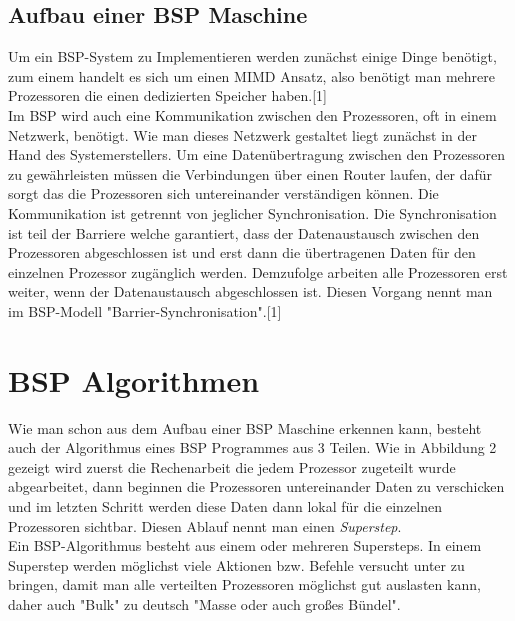 \documentclass[a4paper,10pt]{scrartcl}
\begin{document}
\subsection{Aufbau einer BSP Maschine}
Um ein BSP-System zu Implementieren werden zunächst einige Dinge benötigt, zum einem handelt es sich um einen MIMD Ansatz, also benötigt man mehrere Prozessoren die einen dedizierten Speicher haben.[1]\\
Im BSP wird auch eine Kommunikation zwischen den Prozessoren, oft in einem Netzwerk, benötigt. Wie man dieses Netzwerk gestaltet liegt zunächst in der Hand des Systemerstellers. Um eine Datenübertragung zwischen den Prozessoren zu gewährleisten müssen die Verbindungen über einen Router laufen, der dafür sorgt das die Prozessoren sich untereinander verständigen können. Die Kommunikation ist getrennt von jeglicher Synchronisation. Die Synchronisation ist teil der Barriere welche garantiert, dass der Datenaustausch zwischen den Prozessoren abgeschlossen ist und erst dann die übertragenen Daten für den einzelnen Prozessor zugänglich werden. Demzufolge arbeiten alle Prozessoren erst weiter, wenn der Datenaustausch abgeschlossen ist. Diesen Vorgang nennt man im BSP-Modell "Barrier-Synchronisation".[1]

\section{BSP Algorithmen}
Wie man schon aus dem Aufbau einer BSP Maschine erkennen kann, besteht auch der Algorithmus eines BSP Programmes aus 3 Teilen. Wie in Abbildung 2 gezeigt wird zuerst die Rechenarbeit die jedem Prozessor zugeteilt wurde abgearbeitet, dann beginnen die Prozessoren untereinander Daten zu verschicken und im letzten Schritt werden diese Daten dann lokal für die einzelnen Prozessoren sichtbar. Diesen Ablauf nennt man einen \textit{Superstep}.\\
Ein BSP-Algorithmus besteht aus einem oder mehreren Supersteps. In einem Superstep werden möglichst viele Aktionen bzw. Befehle versucht unter zu bringen, damit man alle verteilten Prozessoren möglichst gut auslasten kann, daher auch "Bulk" zu deutsch "Masse oder auch großes Bündel".  	
\end{document}
